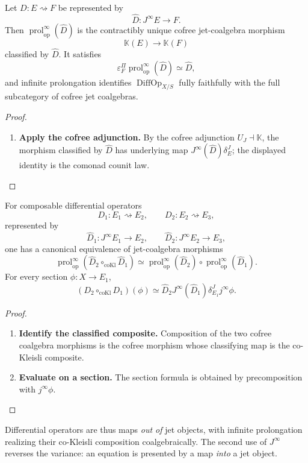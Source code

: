 \begin{theorem}
Let \(D:E\rightsquigarrow F\) be represented by
\[
  \widehat D:J^\infty E\to F.
\]
Then \(\operatorname{prol}_{\mathrm{op}}^\infty(\widehat D)\) is the contractibly unique
cofree jet-coalgebra morphism
\[
  \mathbb K(E)\to\mathbb K(F)
\]
classified by \(\widehat D\). It satisfies
\[
  \varepsilon^\Pi_F\operatorname{prol}_{\mathrm{op}}^\infty(\widehat D)\simeq\widehat D,
\]
and infinite prolongation identifies \(\operatorname{DiffOp}_{X/S}\) fully faithfully with the
full subcategory of cofree jet coalgebras.
\end{theorem}

\begin{proof}
\leavevmode
\begin{enumerate}[label=\textup{(\arabic*)}]
    \item \textbf{Apply the cofree adjunction.}
By the cofree adjunction \(U_J\dashv\mathbb K\), the morphism classified by
\(\widehat D\) has underlying map
\(J^\infty(\widehat D)\delta^J_E\); the displayed identity is the comonad
counit law.
\end{enumerate}
\end{proof}

\begin{proposition}
\label{prop:prolongation-composition}
For composable differential operators
\[
  D_1:E_1\rightsquigarrow E_2,
  \qquad
  D_2:E_2\rightsquigarrow E_3,
\]
represented by
\[
  \widehat D_1:J^\infty E_1\to E_2,
  \qquad
  \widehat D_2:J^\infty E_2\to E_3,
\]
one has a canonical equivalence of jet-coalgebra morphisms
\[
  \operatorname{prol}_{\mathrm{op}}^\infty
  (\widehat D_2\circ_{\mathrm{coKl}}\widehat D_1)
  \simeq
  \operatorname{prol}_{\mathrm{op}}^\infty(\widehat D_2)\circ \operatorname{prol}_{\mathrm{op}}^\infty(\widehat D_1).
\]
For every section \(\phi:X\to E_1\),
\[
  (D_2\circ_{\mathrm{coKl}}D_1)(\phi)
  \simeq
  \widehat D_2J^\infty(\widehat D_1)
  \delta^J_{E_1}j^\infty\phi.
\]
\end{proposition}

\begin{proof}
\leavevmode
\begin{enumerate}[label=\textup{(\arabic*)}]
    \item \textbf{Identify the classified composite.}
Composition of the two cofree coalgebra morphisms is the cofree morphism whose
classifying map is the co-Kleisli composite.

    \item \textbf{Evaluate on a section.}
The section formula is obtained
by precomposition with \(j^\infty\phi\).
\end{enumerate}
\end{proof}
Differential operators are thus maps \emph{out of} jet objects, with infinite
prolongation realizing their co-Kleisli composition coalgebraically. The
second use of \(J^\infty\) reverses the variance: an equation is presented by a
map \emph{into} a jet object.

